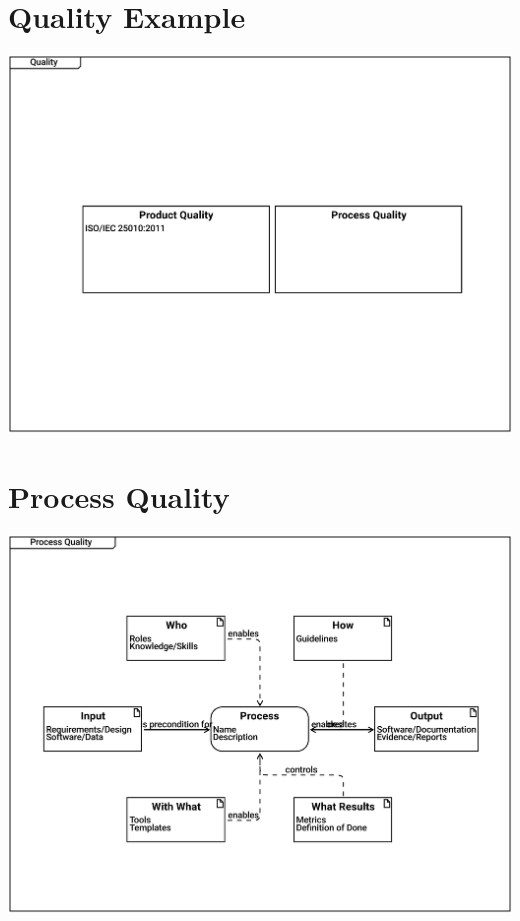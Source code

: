 \documentclass{article}
\begin{document}
\section{Quality Example}

\includegraphics[width= 1.0\linewidth]{quality_export/1_Quality.pdf}


\section{Process Quality}

\includegraphics[width= 1.0\linewidth]{quality_export/3_Process_Quality.pdf}

\end{document}
